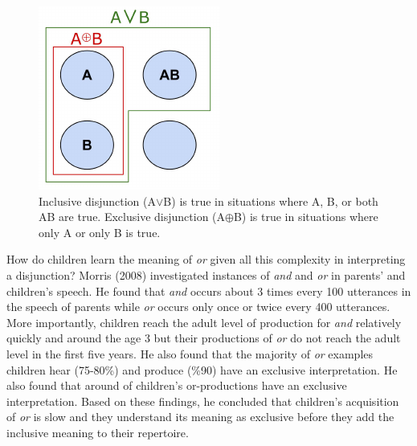 \documentclass[10pt, letterpaper]{article}
\newenvironment{CodeChunk}{}{}
\begin{document}
\begin{CodeChunk}
\begin{figure}[b]

{\centering \includegraphics{figs/aorb-1} 

}

\caption[Inclusive disjunction (A$\vee$B) is true in situations where A, B, or both AB are true]{Inclusive disjunction (A$\vee$B) is true in situations where A, B, or both AB are true. Exclusive disjunction (A$\oplus$B) is true in situations where only A or only B is true.}\label{fig:aorb}
\end{figure}
\end{CodeChunk}

How do children learn the meaning of \emph{or} given all this complexity
in interpreting a disjunction? Morris (2008) investigated instances of
\emph{and} and \emph{or} in parents' and children's speech. He found
that \emph{and} occurs about 3 times every 100 utterances in the speech
of parents while \emph{or} occurs only once or twice every 400
utterances. More importantly, children reach the adult level of
production for \emph{and} relatively quickly and around the age 3 but
their productions of \emph{or} do not reach the adult level in the first
five years. He also found that the majority of \emph{or} examples
children hear (75-80\%) and produce (\%90) have an exclusive
interpretation. He also found that around of children's or-productions
have an exclusive interpretation. Based on these findings, he concluded
that children's acquisition of \emph{or} is slow and they understand its
meaning as exclusive before they add the inclusive meaning to their
repertoire.
\end{document}
